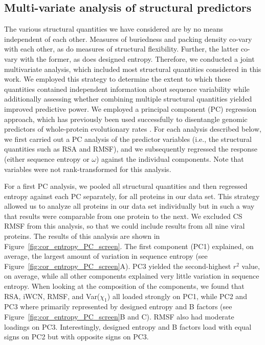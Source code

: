 \documentclass[smallextended]{svjour3}
\begin{document}
\subsection*{Multi-variate analysis of structural predictors}

The various structural quantities we have considered are by no means independent of each other. Measures of buriedness and packing density co-vary with each other, as do measures of structural flexibility. Further, the latter co-vary with the former, as does designed entropy. Therefore, we conducted a joint multivariate analysis, which included most structural quantities considered in this work. We employed this strategy to determine the extent to which these quantities contained independent information about sequence variability while additionally
assessing whether combining multiple structural quantities yielded improved predictive power. We employed a principal component (PC) regression approach, which has previously been used successfully to disentangle genomic predictors of whole-protein evolutionary rates \citep{Drummondetal2006,Bloometal2006}. For each analysis described below, we first carried out a PC analysis of the predictor variables (i.e., the structural quantities such as RSA and RMSF), and we subsequently regressed the response (either sequence entropy or $\omega$) against the individual components. Note that variables were not rank-transformed for this analysis.

For a first PC analysis, we pooled all structural quantities and then regressed entropy against each PC separately, for all proteins in our data set. This strategy allowed us to analyze all proteins in our data set individually but in such a way that results were comparable from one protein to the next. We excluded CS RMSF from this analysis, so that we could include results from all nine viral proteins. The results of this analysis are shown in Figure~\ref{fig:cor_entropy_PC_screen}. The first component (PC1) explained, on average, the largest amount of variation in sequence entropy (see Figure~\ref{fig:cor_entropy_PC_screen}A). PC3 yielded the second-highest $r^2$ value, on average, while all other components explained very little variation in sequence entropy. When looking at the composition of the components, we found that RSA, iWCN, RMSF, and Var($\chi_1$) all loaded strongly on PC1, while PC2 and PC3 where primarily represented by designed entropy and B factors (see Figure~\ref{fig:cor_entropy_PC_screen}B and C). RMSF also had moderate loadings on PC3. Interestingly, designed entropy and B factors load with equal signs on PC2 but with opposite signs on PC3.
\end{document}
